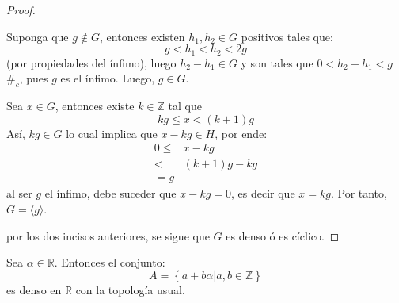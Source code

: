 \documentclass[12pt]{report}
\theoremstyle{largebreak}
\newcommand\contradiction{\ensuremath{\#_c}}
\newcommand\gen[1]{\ensuremath{\langle#1\rangle}}
\begin{document}
\begin{proof}
\begin{enumerate}
            Suponga que $g\notin G$, entonces existen $h_1,h_2\in G$ positivos tales que:
            \begin{equation*}
                g<h_1<h_2<2g
            \end{equation*}
            (por propiedades del ínfimo), luego $h_2-h_1\in G$ y son tales que $0<h_2-h_1<g$\contradiction, pues $g$ es el ínfimo. Luego, $g\in G$.

            Sea $x\in G$, entonces existe $k\in\mathbb{Z}$ tal que
            \begin{equation*}
                kg\leq x< (k+1)g
            \end{equation*}
            Así, $kg\in G$ lo cual implica que $x-kg\in H$, por ende:
            \begin{equation*}
                \begin{split}
                    0\leq& x-kg\\
                    <&(k+1)g-kg\\
                    =g&
                \end{split}
            \end{equation*}
            al ser $g$ el ínfimo, debe suceder que $x-kg=0$, es decir que $x=kg$. Por tanto, $G=\gen{g}$.
        \end{enumerate}
        por los dos incisos anteriores, se sigue que $G$ es denso ó es cíclico.
    \end{proof}

    \begin{propo}
        Sea $\alpha\in\mathbb{R}$. Entonces el conjunto:
        \begin{equation*}
            A=\left\{a+b\alpha\Big|a,b\in\mathbb{Z} \right\}
        \end{equation*}
        es denso en $\mathbb{R}$ con la topología usual.
    \end{propo}
\end{document}
